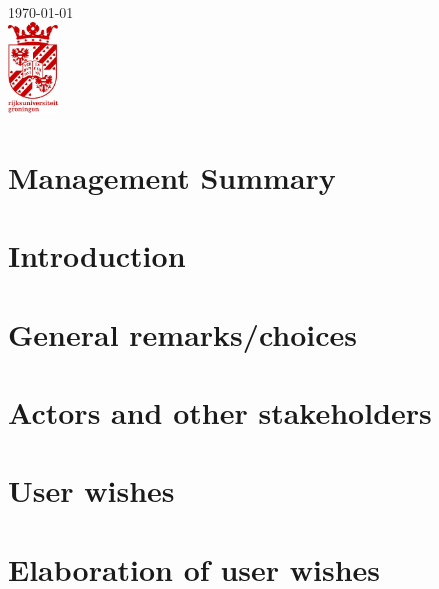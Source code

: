 \documentclass[11pt]{article}
\begin{document}
\begin{titlepage}
\begin{minipage}{0.4\textwidth}
\begin{flushright}
\end{flushright}
\end{minipage}\\[2cm]

{\large \today}\\[2cm] %

\includegraphics[width=50px, keepaspectratio]{logo_rug.jpg}\\[1cm] %

\vfill %

\end{titlepage}

\tableofcontents
\newpage

\section{Management Summary}


\section{Introduction}


\section{General remarks/choices}

\newpage

\section{Actors and other stakeholders}


\section{User wishes}

\newpage

\section{Elaboration of user wishes}

\newpage
\end{document}
